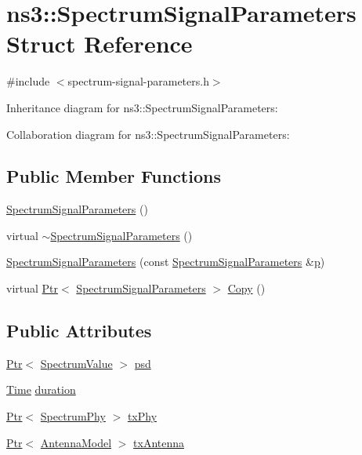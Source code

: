 \hypertarget{structns3_1_1SpectrumSignalParameters}{}\section{ns3\+:\+:Spectrum\+Signal\+Parameters Struct Reference}
\label{structns3_1_1SpectrumSignalParameters}


{\ttfamily \#include $<$spectrum-\/signal-\/parameters.\+h$>$}



Inheritance diagram for ns3\+:\+:Spectrum\+Signal\+Parameters\+:


Collaboration diagram for ns3\+:\+:Spectrum\+Signal\+Parameters\+:
\subsection*{Public Member Functions}
\begin{DoxyCompactItemize}
\item 
\hyperlink{structns3_1_1SpectrumSignalParameters_a700e844708c575b194d9ae24ab459c0c}{Spectrum\+Signal\+Parameters} ()
\item 
virtual \hyperlink{structns3_1_1SpectrumSignalParameters_a75464a5f1f2458672929e7335c6ff915}{$\sim$\+Spectrum\+Signal\+Parameters} ()
\item 
\hyperlink{structns3_1_1SpectrumSignalParameters_aa14908cb657db159849759c950daf79a}{Spectrum\+Signal\+Parameters} (const \hyperlink{structns3_1_1SpectrumSignalParameters}{Spectrum\+Signal\+Parameters} \&\hyperlink{lte__link__budget__x2__handover__measures_8m_ac9de518908a968428863f829398a4e62}{p})
\item 
virtual \hyperlink{classns3_1_1Ptr}{Ptr}$<$ \hyperlink{structns3_1_1SpectrumSignalParameters}{Spectrum\+Signal\+Parameters} $>$ \hyperlink{structns3_1_1SpectrumSignalParameters_a3404dea9df9e0fc4f47fa041bf68855c}{Copy} ()
\end{DoxyCompactItemize}
\subsection*{Public Attributes}
\begin{DoxyCompactItemize}
\item 
\hyperlink{classns3_1_1Ptr}{Ptr}$<$ \hyperlink{classns3_1_1SpectrumValue}{Spectrum\+Value} $>$ \hyperlink{structns3_1_1SpectrumSignalParameters_afc3b87e914306b069232fda861836051}{psd}
\item 
\hyperlink{classns3_1_1Time}{Time} \hyperlink{structns3_1_1SpectrumSignalParameters_aa97149751dce62c95f523622fd5fbfd3}{duration}
\item 
\hyperlink{classns3_1_1Ptr}{Ptr}$<$ \hyperlink{classns3_1_1SpectrumPhy}{Spectrum\+Phy} $>$ \hyperlink{structns3_1_1SpectrumSignalParameters_ab20434042353cbd479e1f9d807f9e37d}{tx\+Phy}
\item 
\hyperlink{classns3_1_1Ptr}{Ptr}$<$ \hyperlink{classns3_1_1AntennaModel}{Antenna\+Model} $>$ \hyperlink{structns3_1_1SpectrumSignalParameters_a1357e30abf1daa897e134d28a900232a}{tx\+Antenna}
\end{DoxyCompactItemize}
